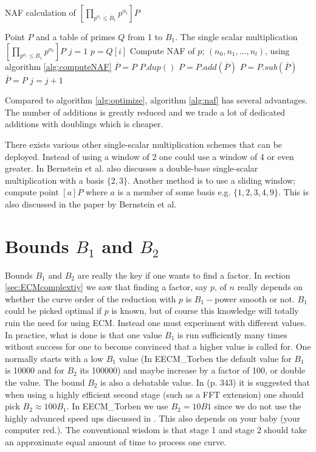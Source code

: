 \begin{algorithm}
\caption{NAF calculation of $\left[\prod_{p^{\alpha_i}\leq B_1} p^{\alpha_i}\right]P$}
\begin{algorithmic}
\label{alg:naf}
\REQUIRE Point $P$ and a table of primes $Q$ from 1 to $B_1$. 
\ENSURE The single scalar multiplication $\left[\prod_{p^{\alpha_i}\leq B_1} p^{\alpha_i}\right]P$ 
\STATE $j=1$
\STATE $p=Q[i]$
\STATE Compute NAF of $p$; $(n_0,n_1,\ldots,n_l)$, using algorithm \ref{alg:computeNAF}
\STATE $\overline{P}=P$
\STATE $P.dup()$
\STATE $P = P.add(\overline{P})$
\ENDIF
{}
\STATE $P = P.sub(\overline{P})$
\ENDIF
\ENDFOR
\STATE $\overline{P}=P$
\STATE $j=j+1$
\ENDWHILE
\ENDFOR
\end{algorithmic}
\end{algorithm}

Compared to algorithm \ref{alg:optimize}, algorithm \ref{alg:naf} has several advantages. The number of additions is greatly reduced and we trade a lot of dedicated additions with doublings which is cheaper. 

There exists various other single-scalar multiplication schemes that can be deployed. Instead of using a window of 2 one could use a window of 4 or even greater. In \cite{cryptoeprint:2007:414} Bernstein et al. also discusses a double-base single-scalar multiplication with a basis $\{2,3\}$. Another method is to use a sliding window; compute point $[a]P$ where $a$ is a member of some basis e.g. $\{1,2,3,4,9\}$. This is also discussed in the paper by Bernstein et al.

\section{Bounds $B_1$ and $B_2$}
Bounds $B_1$ and $B_2$ are really the key if one wants to find a factor. In section \ref{sec:ECMcomplextiy} we saw that finding a factor, say $p$, of $n$ really depends on whether the curve order of the reduction with $p$ is $B_1-$power smooth or not. $B_1$ could be picked optimal if $p$ is known, but of course this knowledge will totally ruin the need for using ECM. Instead one must experiment with different values. In practice, what is done is that one value $B_1$ is run sufficiently many times without success for one to become convinced that a higher value is called for. One normally starts with a low $B_1$ value (In EECM\_Torben the default value for $B_1$ is 10000 and for $B_2$ its 100000) and maybe increase by a factor of 100, or double the value. The bound $B_2$ is also a debatable value. In \cite{pomeranceEt.al} (p. 343) it is suggested that when using a highly efficient second stage (such as a FFT extension) one should pick $B_2\approx 100 B_1$. In EECM\_Torben we use $B_2=10B1$ since we do not use the highly advanced speed ups discussed in \cite{pomeranceEt.al}. This also depends on your baby (your computer red.). The conventional wisdom is that stage 1 and stage 2 should take an approximate equal amount of time to process one curve. 

